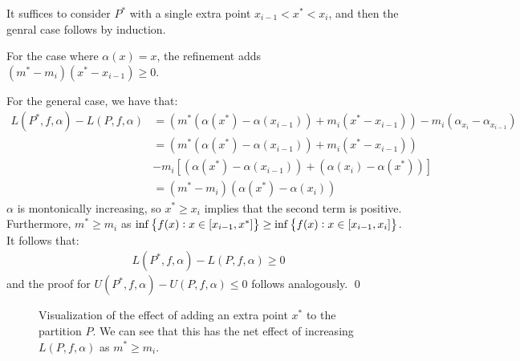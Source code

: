 \begin{nproof}
    It suffices to consider $P^*$ with a single extra point $x_{i - 1} < x^* < x_i$, and then the genral case follows by induction.

    For the case where $\alpha(x) = x$, the refinement adds $(m^* - m_i)(x^* - x_{i-1}) \geq 0$. 

    For the general case, we have that:
    \begin{align*}
        L(P^*, f, \alpha) - L(P, f, \alpha) &= \left(m^*(\alpha(x^*) - \alpha(x_{i-1})) + m_i(x^* - x_{i-1}) \right)- m_i(\alpha_{x_i} - \alpha_{x_{i-1}})
        \\ &= \left(m^*(\alpha(x^*) - \alpha(x_{i-1})) + m_i(x^* - x_{i-1}) \right)
        \\ &- m_i\left[(\alpha(x^*) - \alpha(x_{i-1})) + (\alpha(x_i) - \alpha(x^*))\right]
        \\ &= (m^* - m_i)(\alpha(x^*) - \alpha(x_i))
    \end{align*}
    $\alpha$ is montonically increasing, so $x^* \geq x_i$ implies that the second term is positive. Furthermore, $m^* \geq m_i$ as $\inf\set{f(x): x \in [x_{i-1}, x^*]} \geq \inf\set{f(x): x \in [x_{i-1}, x_i]}$. It follows that:
    \begin{align*}
        L(P^*, f, \alpha) - L(P, f, \alpha) \geq 0
    \end{align*} 
    and the proof for $U(P^*, f, \alpha) - U(P, f, \alpha) \leq 0$ follows analogously. \qed
\end{nproof}
\begin{figure}[htbp]
    \centering
    
    \caption{Visualization of the effect of adding an extra point $x^*$ to the partition $P$. We can see that this has the net effect of increasing $L(P, f, \alpha)$ as $m^* \geq m_i$.}
    \label{fig29}
\end{figure}

